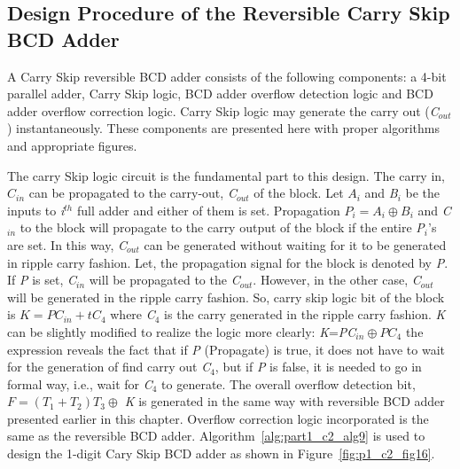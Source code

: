 \subsection{Design Procedure of the Reversible Carry Skip BCD Adder}

A Carry Skip reversible BCD adder consists of the following components: a 4-bit parallel adder, Carry Skip logic, BCD adder overflow detection logic and BCD adder overflow correction logic. Carry Skip logic may generate the carry out ({\it C}${}_{out}$) instantaneously. These components are presented here with proper algorithms and appropriate figures.

The carry Skip logic circuit is the fundamental part to this design. The carry in, $C{}_{in}$ can be propagated to the carry-out, {\it C}${}_{out}$ of the block. Let $A{}_{i}$ and {\it B${}_{i}$} be the inputs to {\it i${}^{th}$} full adder and either of them is set. Propagation $P{}_{i}={A{}_{i}}\oplus B{}_{i}$ and {\it C}${}_{in}$ to the block will propagate to the carry output of the block if the entire {\it P${}_{i}$}'s are set. In this way, {\it C}${}_{out}$ can be generated without waiting for it to be generated in ripple carry fashion. Let, the propagation signal for the block is denoted by {\it P}. If {\it P }is set, {\it C}${}_{in}$ will be propagated to the {\it C}${}_{out}$. However, in the other case, {\it C}${}_{out}$ will be generated in the ripple carry fashion. So, carry skip logic bit of the block is $K ={ PC}{}_{in}+t C{}_{4}$ where {\it C}${}_{4}$ is the carry generated in the ripple carry fashion. {\it K } can be slightly modified to realize the logic more clearly: {\it K}={\it PC}${}_{in}\oplus${\it ${P}C$}${}_{4}$ the expression reveals the fact that if {\it P }(Propagate) is true, it does not have to wait for the generation of find carry out {\it C}${}_{4}$, but if {\it P }is false, it is needed to go in formal way, i.e., wait for {\it C${}_{4}$} to generate. The overall overflow detection bit, $F= (T{}_{1}+T{}_{2})T{}_{3}\oplus$ {\it K }is generated in the same way with reversible BCD adder presented earlier in this chapter. Overflow correction logic incorporated is the same as the reversible BCD adder.
Algorithm~\ref{alg:part1_c2_alg9} is used to design the 1-digit Cary Skip BCD adder as shown in Figure~\ref{fig:p1_c2_fig16}.

